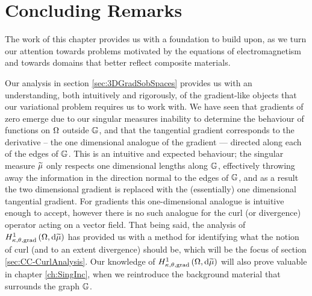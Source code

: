 \section{Concluding Remarks} \label{sec:Scalar-Conc}
The work of this chapter provides us with a foundation to build upon, as we turn our attention towards problems motivated by the equations of electromagnetism and towards domains that better reflect composite materials.

Our analysis in section \ref{sec:3DGradSobSpaces} provides us with an understanding, both intuitively and rigorously, of the gradient-like objects that our variational problem requires us to work with.
We have seen that gradients of zero emerge due to our singular measures inability to determine the behaviour of functions on $\Omega$ outside $\mathbb{G}$, and that the tangential gradient corresponds to the derivative -- the one dimensional analogue of the gradient --- directed along each of the edges of $\mathbb{G}$.
This is an intuitive and expected behaviour; the singular measure $\widetilde{\mu}$ only respects one dimensional lengths along $\mathbb{G}$, effectively throwing away the information in the direction normal to the edges of $\mathbb{G}$, and as a result the two dimensional gradient is replaced with the (essentially) one dimensional tangential gradient.
For gradients this one-dimensional analogue is intuitive enough to accept, however there is no such analogue for the curl (or divergence) operator acting on a vector field.
That being said, the analysis of $H^1_{\kappa,\theta,\mathrm{grad}}\left( \Omega, \mathrm{d}\widetilde{\mu} \right)$ has provided us with a method for identifying what the notion of curl (and to an extent divergence) should be, which will be the focus of section \ref{sec:CC-CurlAnalysis}.
Our knowledge of $H^1_{\kappa,\theta,\mathrm{grad}}\left( \Omega, \mathrm{d}\widetilde{\mu} \right)$ will also prove valuable in chapter \ref{ch:SingInc}, when we reintroduce the background material that surrounds the graph $\mathbb{G}$.

